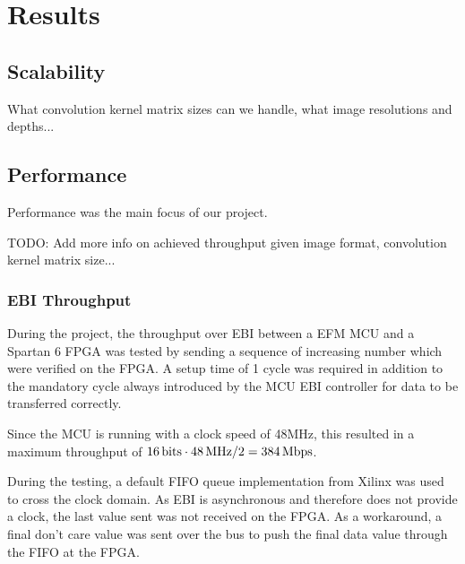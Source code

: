 \section{Results}


\subsection{Scalability}
What convolution kernel matrix sizes can we handle, what image resolutions and depths...

\subsection{Performance}
Performance was the main focus of our project.

TODO: Add more info on achieved throughput given image format, convolution kernel matrix size...

\subsubsection{EBI Throughput}
During the project, the throughput over EBI between a EFM MCU and a Spartan 6 FPGA was tested by sending a sequence of increasing number which were verified on the FPGA.
A setup time of 1 cycle was required in addition to the mandatory cycle always introduced by the MCU EBI controller for data to be transferred correctly.

Since the MCU is running with a clock speed of 48MHz, this resulted in a maximum throughput of $\unit[16]{bits} \cdot \unit[48]{MHz} / 2 = \unit[384]{Mbps}$.

During the testing, a default FIFO queue implementation from Xilinx was used to cross the clock domain.
As EBI is asynchronous and therefore does not provide a clock, the last value sent was not received on the FPGA.
As a workaround, a final don't care value was sent over the bus to push the final data value through the FIFO at the FPGA.
